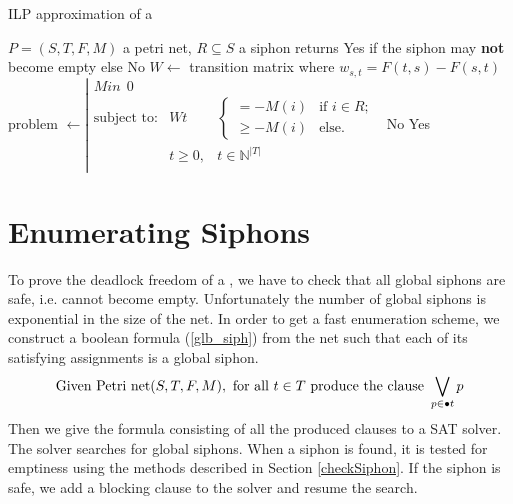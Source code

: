 \documentclass[a4paper]{report}
\numberwithin{algorithm}{chapter}
\begin{document}
\begin{description}
\begin{algorithm}
\caption{ILP approximation of a \pn{}}
\label{algILPApprox}
\begin{algorithmic}
\REQUIRE $P = (S,T,F,M)$ a petri net, $R \subseteq S$ a siphon %
\ENSURE returns Yes if the siphon may \textbf{not} become empty else No %
\STATE $W \leftarrow $ transition matrix where $w_{s,t} = F(t,s) - F(s,t)$
\STATE problem $\leftarrow \left|
\begin{array}{lrl}
Min ~~ 0 & &\\
\text{subject to:} &
W t & \left\{ \begin{array}{ll}
         = -M(i) & \mbox{if $i \in R$};\\
         \ge -M(i) & \mbox{else}.
  \end{array} \right.\\
 & t \ge 0 , & t \in \mathbb{N}^{|T|}  \\
 \end{array} \right.$
\RETURN No
\ELSE
\RETURN Yes
\ENDIF 
\end{algorithmic}
\end{algorithm}


\end{description}

\section{Enumerating Siphons}

To prove the deadlock freedom of a \pn{}, we have to check that all global siphons are safe, i.e. cannot become empty.
Unfortunately the number of global siphons is exponential in the size of the net.
In order to get a fast enumeration scheme, we construct a boolean formula (\ref{glb_siph}) from the net such that each of its satisfying assignments is a global siphon.
\begin{equation}
\label{glb_siph} \text{Given \pn{}}(S,T,F,M), ~\text{for all} ~ t \in T ~ \text{produce the clause} ~ \bigvee_{p \in \bullet t} p
\end{equation}
Then we give the formula consisting of all the produced clauses to a SAT solver.
The solver searches for global siphons.
When a siphon is found, it is tested for emptiness using the methods described in Section \ref{checkSiphon}.
If the siphon is safe, we add a blocking clause to the solver and resume the search.
\end{document}
